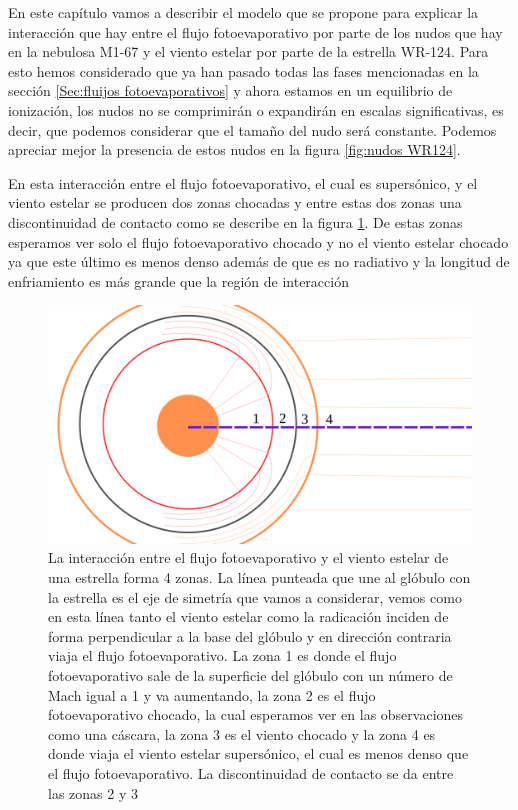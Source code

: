 \documentclass{book}
\begin{document}
En este capítulo vamos a describir el modelo que se propone para explicar la interacción que hay entre el flujo fotoevaporativo por parte de los nudos que hay en la nebulosa M1-67 y el viento estelar por parte de la estrella WR-124. Para esto hemos considerado que ya han pasado todas las fases mencionadas en la sección \ref{Sec:fluijos fotoevaporativos} y ahora estamos en un equilibrio de ionización, los nudos no se comprimirán o expandirán en escalas significativas, es decir, que podemos considerar que el tamaño del nudo será constante. Podemos apreciar mejor la presencia de estos nudos en la figura \ref{fig:nudos WR124}.

En esta interacción entre el flujo fotoevaporativo, el cual es supersónico, y el viento estelar se producen dos zonas chocadas y entre estas dos zonas una discontinuidad de contacto como se describe en la figura \ref{fig:zones}. De estas zonas esperamos ver solo el flujo fotoevaporativo chocado y no el viento estelar chocado ya que este último es menos denso además de que es no radiativo y la longitud de enfriamiento es más grande que la región de interacción

\begin{figure}[h]
    \centering    \includegraphics[width=\textwidth]{artesanales/ImgFi01-1.pdf}
    \caption{La interacción entre el flujo fotoevaporativo y el viento estelar de una estrella forma 4 zonas. La línea punteada que une al glóbulo con la estrella es el eje de simetría que vamos a considerar, vemos como en esta línea tanto el viento estelar como la radicación inciden de forma perpendicular a la base del glóbulo y en dirección contraria viaja el flujo fotoevaporativo. La zona 1 es donde el flujo fotoevaporativo sale de la superficie del glóbulo con un número de Mach igual a 1 y va aumentando, la zona 2 es el flujo fotoevaporativo chocado, la cual esperamos ver en las observaciones como una cáscara, la zona 3 es el viento chocado y la zona 4 es donde viaja el viento estelar supersónico, el cual es menos denso que el flujo fotoevaporativo. La discontinuidad de contacto se da entre las zonas 2 y 3}
    \label{fig:zones}
\end{figure}
\end{document}
